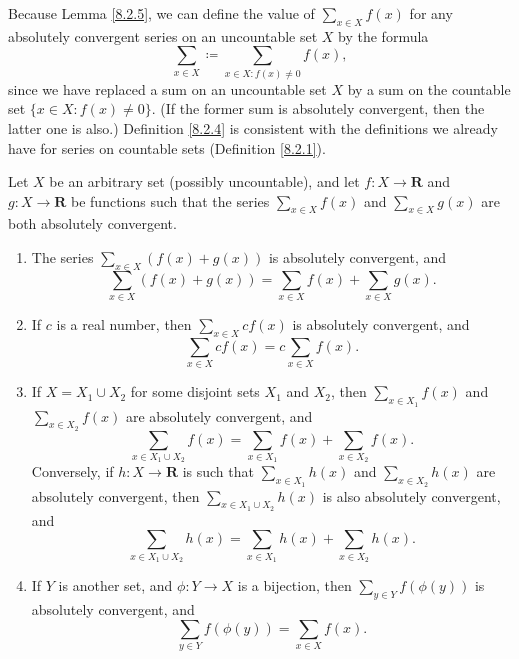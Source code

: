 \begin{note}
    Because Lemma \ref{8.2.5}, we can define the value of \(\sum_{x \in X} f(x)\) for any absolutely convergent series on an uncountable set \(X\) by the formula
    \[
        \sum_{x \in X} \coloneqq \sum_{x \in X : f(x) \neq 0} f(x),
    \]
    since we have replaced a sum on an uncountable set \(X\) by a sum on the countable set \(\{x \in X : f(x) \neq 0\}\).
    (If the former sum is absolutely convergent, then the latter one is also.)
    Definition \ref{8.2.4} is consistent with the definitions we already have for series on countable sets (Definition \ref{8.2.1}).
\end{note}

\begin{proposition}\label{8.2.6}
    Let \(X\) be an arbitrary set (possibly uncountable), and let \(f : X \to \mathbf{R}\) and \(g : X \to \mathbf{R}\) be functions such that the series \(\sum_{x \in X} f(x)\) and \(\sum_{x \in X} g(x)\) are both absolutely convergent.
    \begin{enumerate}
        \item The series \(\sum_{x \in X} (f(x) + g(x))\) is absolutely convergent, and
              \[
                  \sum_{x \in X} (f(x) + g(x)) = \sum_{x \in X} f(x) + \sum_{x \in X} g(x).
              \]
        \item If \(c\) is a real number, then \(\sum_{x \in X} cf(x)\) is absolutely convergent, and
              \[
                  \sum_{x \in X} cf(x) = c \sum_{x \in X} f(x).
              \]
        \item If \(X = X_1 \cup X_2\) for some disjoint sets \(X_1\) and \(X_2\), then \(\sum_{x \in X_1} f(x)\) and \(\sum_{x \in X_2} f(x)\) are absolutely convergent, and
              \[
                  \sum_{x \in X_1 \cup X_2} f(x) = \sum_{x \in X_1} f(x) + \sum_{x \in X_2} f(x).
              \]
              Conversely, if \(h : X \to \mathbf{R}\) is such that \(\sum_{x \in X_1} h(x)\) and \(\sum_{x \in X_2} h(x)\) are absolutely convergent, then \(\sum_{x \in X_1 \cup X_2} h(x)\) is also absolutely convergent, and
              \[
                  \sum_{x \in X_1 \cup X_2} h(x) = \sum_{x \in X_1} h(x) + \sum_{x \in X_2} h(x).
              \]
        \item If \(Y\) is another set, and \(\phi : Y \to X\) is a bijection, then \(\sum_{y \in Y} f(\phi(y))\) is absolutely convergent, and
              \[
                  \sum_{y \in Y} f(\phi(y)) = \sum_{x \in X} f(x).
              \]
    \end{enumerate}
\end{proposition}

